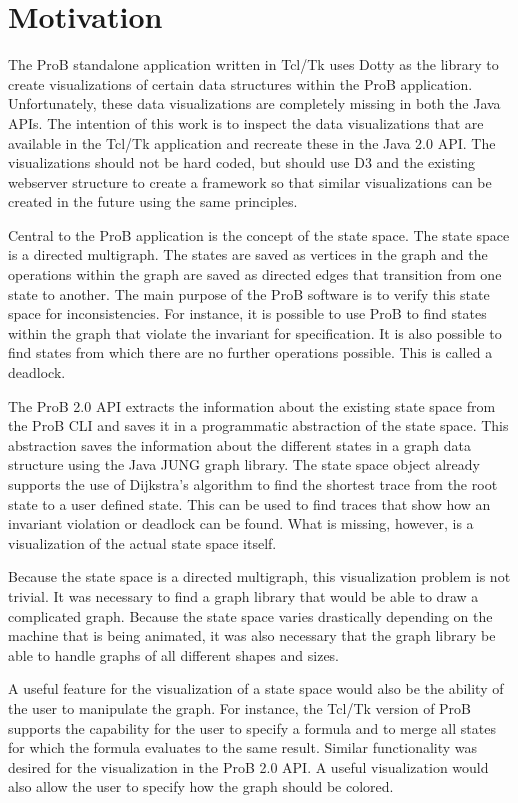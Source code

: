 \section{Motivation}

The ProB standalone application written in Tcl/Tk uses Dotty as the library to create visualizations of certain data structures within the ProB application. Unfortunately, these data visualizations are completely missing in both the Java APIs. The intention of this work is to inspect the data visualizations that are available in the Tcl/Tk application and recreate these in the Java 2.0 API. The visualizations should not be hard coded, but should use D3 and the existing webserver structure to create a framework so that similar visualizations can be created in the future using the same principles.

Central to the ProB application is the concept of the state space. The state space is a directed multigraph. The states are saved as vertices in the graph and the operations within the graph are saved as directed edges that transition from one state to another. The main purpose of the ProB software is to verify this state space for inconsistencies. For instance, it is possible to use ProB to find states within the graph that violate the invariant for specification. It is also possible to find states from which there are no further operations possible. This is called a deadlock.

The ProB 2.0 API extracts the information about the existing state space from the ProB CLI and saves it in a programmatic abstraction of the state space. This abstraction saves the information about the different states in a graph data structure using the Java JUNG graph library. The state space object already supports the use of Dijkstra's algorithm to find the shortest trace from the root state to a user defined state. This can be used to find traces that show how an invariant violation or deadlock can be found. What is missing, however, is a visualization of the actual state space itself.

Because the state space is a directed multigraph, this visualization problem is not trivial. It was necessary to find a graph library that would be able to draw a complicated graph. Because the state space varies drastically depending on the machine that is being animated, it was also necessary that the graph library be able to handle graphs of all different shapes and sizes.

A useful feature for the visualization of a state space would also be the ability of the user to manipulate the graph. For instance, the Tcl/Tk version of ProB supports the capability for the user to specify a formula and to merge all states for which the formula evaluates to the same result. Similar functionality was desired for the visualization in the ProB 2.0 API. A useful visualization would also allow the user to specify how the graph should be colored.

